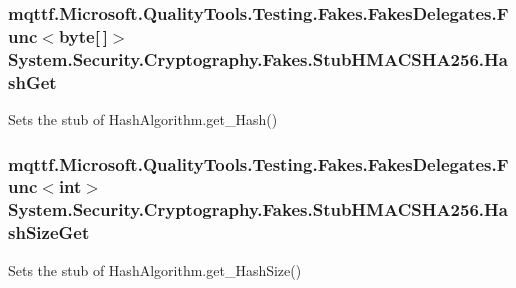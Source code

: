 \hypertarget{class_system_1_1_security_1_1_cryptography_1_1_fakes_1_1_stub_h_m_a_c_s_h_a256_ad0dbe20e7f3f4809ab8ca5bb4548a97d}{
\subsubsection[{Hash\-Get}]{\setlength{\rightskip}{0pt plus 5cm}mqttf.\-Microsoft.\-Quality\-Tools.\-Testing.\-Fakes.\-Fakes\-Delegates.\-Func$<$byte\mbox{[}$\,$\mbox{]}$>$ System.\-Security.\-Cryptography.\-Fakes.\-Stub\-H\-M\-A\-C\-S\-H\-A256.\-Hash\-Get}}\label{class_system_1_1_security_1_1_cryptography_1_1_fakes_1_1_stub_h_m_a_c_s_h_a256_ad0dbe20e7f3f4809ab8ca5bb4548a97d}


Sets the stub of Hash\-Algorithm.\-get\-\_\-\-Hash()

\hypertarget{class_system_1_1_security_1_1_cryptography_1_1_fakes_1_1_stub_h_m_a_c_s_h_a256_af3448ff7a8c61e79e6251ec990686b0b}{
\subsubsection[{Hash\-Size\-Get}]{\setlength{\rightskip}{0pt plus 5cm}mqttf.\-Microsoft.\-Quality\-Tools.\-Testing.\-Fakes.\-Fakes\-Delegates.\-Func$<$int$>$ System.\-Security.\-Cryptography.\-Fakes.\-Stub\-H\-M\-A\-C\-S\-H\-A256.\-Hash\-Size\-Get}}\label{class_system_1_1_security_1_1_cryptography_1_1_fakes_1_1_stub_h_m_a_c_s_h_a256_af3448ff7a8c61e79e6251ec990686b0b}


Sets the stub of Hash\-Algorithm.\-get\-\_\-\-Hash\-Size()

